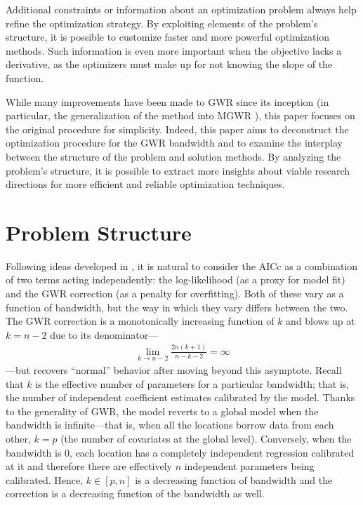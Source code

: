 \documentclass[letterpaper,12pt,twocolumn]{article}
\begin{document}
Additional constraints or information about an optimization problem always help refine the optimization strategy. By exploiting elements of the problem's structure, it is possible to customize faster and more powerful optimization methods. Such information is even more important when the objective lacks a derivative, as the optimizers must make up for not knowing the slope of the function.

While many improvements have been made to GWR since its inception (in particular, the generalization of the method into MGWR \cite{Oshan2019}), this paper focuses on the original procedure for simplicity. Indeed, this paper aims to deconstruct the optimization procedure for the GWR bandwidth and to examine the interplay between the structure of the problem and solution methods. By analyzing the problem's structure, it is possible to extract more insights about viable research directions for more efficient and reliable optimization techniques.

\section{Problem Structure}
\label{sec:problem}
Following ideas developed in \cite{Hoffman2021}, it is natural to consider the AICc as a combination of two terms acting independently: the log-likelihood (as a proxy for model fit) and the GWR correction (as a penalty for overfitting). Both of these vary as a function of bandwidth, but the way in which they vary differs between the two. The GWR correction is a monotonically increasing function of $k$ and blows up at $k = n-2$ due to its denominator--- \begin{align*}
    \lim_{k\rightarrow n-2} \frac{2n(k+1)}{n-k-2} = \infty
\end{align*} ---but recovers ``normal'' behavior after moving beyond this asymptote. Recall that $k$ is the effective number of parameters for a particular bandwidth; that is, the number of independent coefficient estimates calibrated by the model. Thanks to the generality of GWR, the model reverts to a global model when the bandwidth is infinite---that is, when all the locations borrow data from each other, $k = p$ (the number of covariates at the global level). Conversely, when the bandwidth is 0, each location has a completely independent regression calibrated at it and therefore there are effectively $n$ independent parameters being calibrated. Hence, $k \in [p, n]$ is a decreasing function of bandwidth and the correction is a decreasing function of the bandwidth as well.
\end{document}
